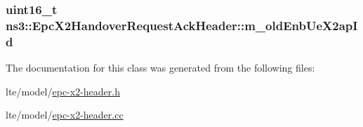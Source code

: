 \subsubsection[{\texorpdfstring{m\+\_\+old\+Enb\+Ue\+X2ap\+Id}{m_oldEnbUeX2apId}}]{\setlength{\rightskip}{0pt plus 5cm}uint16\+\_\+t ns3\+::\+Epc\+X2\+Handover\+Request\+Ack\+Header\+::m\+\_\+old\+Enb\+Ue\+X2ap\+Id\hspace{0.3cm}{\ttfamily [private]}}\hypertarget{classns3_1_1EpcX2HandoverRequestAckHeader_a5a92dccc1ba92cab6e24c3ee08c3f418}{}\label{classns3_1_1EpcX2HandoverRequestAckHeader_a5a92dccc1ba92cab6e24c3ee08c3f418}


The documentation for this class was generated from the following files\+:\begin{DoxyCompactItemize}
\item 
lte/model/\hyperlink{epc-x2-header_8h}{epc-\/x2-\/header.\+h}\item 
lte/model/\hyperlink{epc-x2-header_8cc}{epc-\/x2-\/header.\+cc}\end{DoxyCompactItemize}
